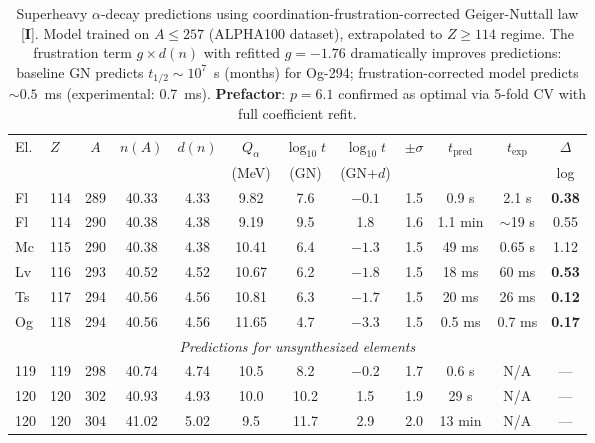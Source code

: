 %

\begin{table}[htbp]
\centering
\caption{Superheavy $\alpha$-decay predictions using coordination-frustration-corrected
Geiger-Nuttall law [\textbf{I}]. Model trained on $A \leq 257$ (ALPHA100 dataset),
extrapolated to $Z \geq 114$ regime. The frustration term $g \times d(n)$ with
refitted $g = -1.76$ dramatically improves predictions: baseline GN predicts
$t_{1/2} \sim 10^7$~s (months) for Og-294; frustration-corrected model predicts
$\sim 0.5$~ms (experimental: 0.7~ms). \textbf{Prefactor}: $p = 6.1$ confirmed as
optimal via 5-fold CV with full coefficient refit.}
\label{tab:superheavy_predictions}
\small
\begin{tabular}{@{}llcccccccccc@{}}
\toprule
El. & $Z$ & $A$ & $n(A)$ & $d(n)$ & $Q_\alpha$ & $\log_{10} t$ & $\log_{10} t$ & $\pm\sigma$ & $t_\mathrm{pred}$ & $t_\mathrm{exp}$ & $\Delta$ \\
    &     &     &        &        & (MeV)      & (GN)          & (GN+$d$)      &             &                   &                  & log \\
\midrule
Fl  & 114 & 289 & 40.33 & 4.33 &  9.82 &  7.6 & $-0.1$ & 1.5 & 0.9 s   & 2.1 s      & \textbf{0.38} \\
Fl  & 114 & 290 & 40.38 & 4.38 &  9.19 &  9.5 &  1.8   & 1.6 & 1.1 min & $\sim$19 s & 0.55 \\
Mc  & 115 & 290 & 40.38 & 4.38 & 10.41 &  6.4 & $-1.3$ & 1.5 & 49 ms   & 0.65 s     & 1.12 \\
Lv  & 116 & 293 & 40.52 & 4.52 & 10.67 &  6.2 & $-1.8$ & 1.5 & 18 ms   & 60 ms      & \textbf{0.53} \\
Ts  & 117 & 294 & 40.56 & 4.56 & 10.81 &  6.3 & $-1.7$ & 1.5 & 20 ms   & 26 ms      & \textbf{0.12} \\
Og  & 118 & 294 & 40.56 & 4.56 & 11.65 &  4.7 & $-3.3$ & 1.5 & 0.5 ms  & 0.7 ms     & \textbf{0.17} \\
\midrule
\multicolumn{12}{c}{\textit{Predictions for unsynthesized elements}} \\
\midrule
119 & 119 & 298 & 40.74 & 4.74 & 10.5  &  8.2 & $-0.2$ & 1.7 & 0.6 s   & N/A     & --- \\
120 & 120 & 302 & 40.93 & 4.93 & 10.0  & 10.2 &  1.5   & 1.9 & 29 s    & N/A     & --- \\
120 & 120 & 304 & 41.02 & 5.02 &  9.5  & 11.7 &  2.9   & 2.0 & 13 min  & N/A     & --- \\
\bottomrule
\end{tabular}


\end{table}
